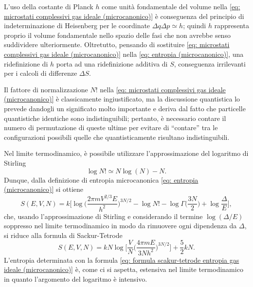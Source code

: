 \begin{obs}
    L'uso della costante di Planck $h$ come unità fondamentale del volume nella \eqref{eq: microstati complessivi gas ideale (microcanonico)} è conseguenza del principio di indeterminazione di Heisenberg per le coordinate $\Delta q\Delta p \simeq h$; quindi $h$ rappresenta proprio il volume fondamentale nello spazio delle fasi che non avrebbe senso suddividere ulteriormente. Oltretutto, pensando di sostituire \eqref{eq: microstati complessivi gas ideale (microcanonico)} nella \eqref{eq: entropia (microcanonico)}, una ridefinizione di $h$ porta ad una ridefinizione additiva di $S$, conseguenza irrilevanti per i calcoli di differenze $\Delta S$.  
\end{obs}
\begin{obs}
    Il fattore di normalizzazione $N!$ nella \eqref{eq: microstati complessivi gas ideale (microcanonico)} è classicamente ingiustificato, ma la discussione quantistica lo prevede dandogli un significato molto importante e deriva dal fatto che particelle quantistiche identiche sono indistinguibili; pertanto, è necessario contare il numero di permutazione di queste ultime per evitare di ``contare'' tra le configurazioni possibili quelle che quantisticamente risultano indistinguibili. 
\end{obs}
Nel limite termodinamico, è possibile utilizzare l'approssimazione del logaritmo di Stirling
\begin{equation}
\label{eq: approssimazione stirling}
    \log{N!} \simeq N\log{(N)} - N.
\end{equation}
Dunque, dalla definizione di entropia microcanonica \eqref{eq: entropia (microcanonico)} si ottiene 
\begin{equation}
    S(E,V,N) = k\bigg[\log{\bigg(\frac{2\pi m V^{2/3}E}{h^2}\bigg)^{3N/2}} - \log{N!} - \log{\Gamma\bigg(\frac{3N}{2}\bigg) + \log{\frac{\Delta}{E}}}\bigg],
\end{equation}
che, usando l'approssimazione di Stirling e considerando il termine $\log{(\Delta/E)}$ soppresso nel limite termodinamico in modo da rimuovere ogni dipendenza da $\Delta$, si riduce alla formula di Sackur-Tetrode
\begin{equation}
\label{eq: formula scakur-tetrode entropia gas ideale (microcanonico)}
    S(E,V,N) = kN\log{\bigg[\frac{V}{N}\bigg(\frac{4\pi mE}{3Nh^2}\bigg)^{3N/2}}\bigg] + \frac{5}{2}kN.
\end{equation}
L'entropia determinata con la formula \eqref{eq: formula scakur-tetrode entropia gas ideale (microcanonico)} è, come ci si aspetta, estensiva nel limite termodinamico in quanto l'argomento del logaritmo è intensivo.
